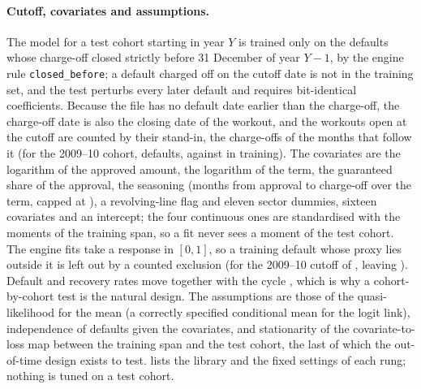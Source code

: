 \paragraph{Cutoff, covariates and assumptions.} The model for a test cohort starting in year $Y$ is trained only on the defaults whose charge-off closed strictly before 31 December of year $Y-1$, by the engine rule \texttt{closed\_before}; a default charged off on the cutoff date is not in the training set, and the test perturbs every later default and requires bit-identical coefficients. Because the file has no default date earlier than the charge-off, the charge-off date is also the closing date of the workout, and the workouts open at the cutoff are counted by their stand-in, the charge-offs of the  months that follow it (for the 2009--10 cohort,  defaults, against  in training). The covariates are the logarithm of the approved amount, the logarithm of the term, the guaranteed share of the approval, the seasoning (months from approval to charge-off over the term, capped at ), a revolving-line flag and eleven sector dummies, sixteen covariates and an intercept; the four continuous ones are standardised with the moments of the training span, so a fit never sees a moment of the test cohort. The engine fits take a response in $[0,1]$, so a training default whose proxy lies outside it is left out by a counted exclusion (for the 2009--10 cutoff  of , leaving ). Default and recovery rates move together with the cycle \citep{lgd-ead:altman2005}, which is why a cohort-by-cohort test is the natural design. The assumptions are those of the quasi-likelihood for the mean (a correctly specified conditional mean for the logit link), independence of defaults given the covariates, and stationarity of the covariate-to-loss map between the training span and the test cohort, the last of which the out-of-time design exists to test.  lists the library and the fixed settings of each rung; nothing is tuned on a test cohort.



